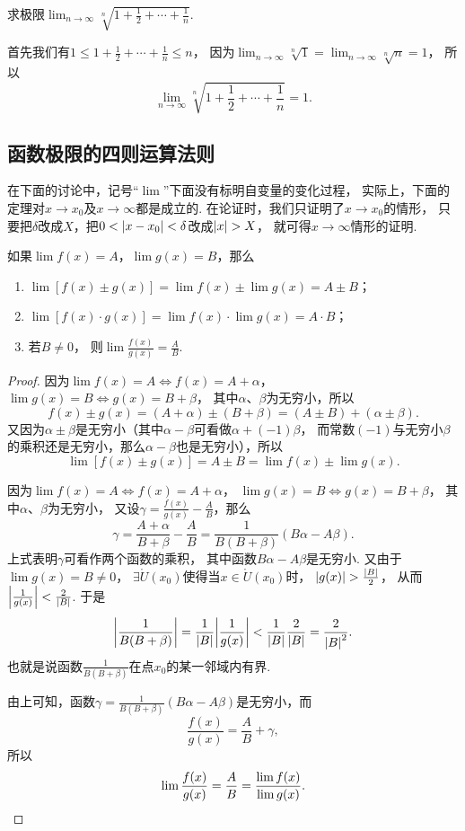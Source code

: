 \begin{example}
求极限\(\lim_{n\to\infty} \sqrt[n]{1+\frac12+\dotsb+\frac1n}\).
\begin{solution}
首先我们有\(1 \leq 1+\frac12+\dotsb+\frac1n \leq n\)，
因为\(\lim_{n\to\infty} \sqrt[n]{1} = \lim_{n\to\infty} \sqrt[n]{n} = 1\)，
所以\[
	\lim_{n\to\infty} \sqrt[n]{1+\frac12+\dotsb+\frac1n} = 1.
\]
\end{solution}
\end{example}

\subsection{函数极限的四则运算法则}
在下面的讨论中，记号“\(\lim\)”下面没有标明自变量的变化过程，
实际上，下面的定理对\(x \to x_0\)及\(x \to \infty\)都是成立的.
在论证时，我们只证明了\(x \to x_0\)的情形，
只要把\(\delta\)改成\(X\)，把\(0<\abs{x-x_0}<\delta\)改成\(\abs{x}>X\)，
就可得\(x\to\infty\)情形的证明.

\begin{theorem}\label{theorem:极限.极限的四则运算法则}
如果\(\lim f(x)=A\)，\(\lim g(x)=B\)，那么\begin{enumerate}
	\item \(\lim [f(x) \pm g(x)] = \lim f(x) \pm \lim g(x) = A \pm B\)；
	\item \(\lim [f(x) \cdot g(x)] = \lim f(x) \cdot \lim g(x) = A \cdot B\)；
	\item 若\(B\neq0\)，
	则\(\lim \frac{f(x)}{g(x)} = \frac{A}{B}\).
\end{enumerate}
\begin{proof}
因为\(\lim f(x)=A \iff f(x)=A+\alpha\)，\(\lim g(x)=B \iff g(x)=B+\beta\)，
其中\(\alpha\)、\(\beta\)为无穷小，所以\[
	f(x) \pm g(x) = (A+\alpha)\pm(B+\beta) = (A \pm B) + (\alpha \pm \beta).
\]
又因为\(\alpha\pm\beta\)是无穷小（其中\(\alpha-\beta\)可看做\(\alpha+(-1)\beta\)，
而常数\((-1)\)与无穷小\(\beta\)的乘积还是无穷小，那么\(\alpha-\beta\)也是无穷小），所以\[
	\lim [f(x) \pm g(x)] = A \pm B = \lim f(x) \pm \lim g(x).
\]

因为\(\lim f(x)=A \iff f(x)=A+\alpha\)，
\(\lim g(x)=B \iff g(x)=B+\beta\)，
其中\(\alpha\)、\(\beta\)为无穷小，
又设\(\gamma = \frac{f(x)}{g(x)} - \frac{A}{B}\)，那么\[
	\gamma = \frac{A+\alpha}{B+\beta} - \frac{A}{B}
	= \frac{1}{B(B+\beta)} (B \alpha - A \beta).
\]
上式表明\(\gamma\)可看作两个函数的乘积，
其中函数\(B \alpha - A \beta\)是无穷小.
又由于\(\lim g(x) = B \neq 0\)，
\(\exists \mathring{U}(x_0)\)使得当\(x\in\mathring{U}(x_0)\)时，
\(\abs{g(x)}>\frac{\abs{B}}{2}\)，
从而\(\abs{\frac{1}{g(x)}}<\frac{2}{\abs{B}}\).
于是\[
	\abs{\frac{1}{B(B+\beta)}}
	=\frac{1}{\abs{B}} \abs{\frac{1}{g(x)}}
	<\frac{1}{\abs{B}} \frac{2}{\abs{B}}
	=\frac{2}{\abs{B}^2}.
\]
也就是说函数\(\frac{1}{B(B+\beta)}\)在点\(x_0\)的某一邻域内有界.

由上可知，函数\(\gamma = \frac{1}{B(B+\beta)} (B \alpha - A \beta)\)是无穷小，而\[
\frac{f(x)}{g(x)} = \frac{A}{B} + \gamma,
\]所以\[
\lim\frac{f(x)}{g(x)} = \frac{A}{B} = \frac{\lim f(x)}{\lim g(x)}.
\qedhere
\]
\end{proof}
\end{theorem}

